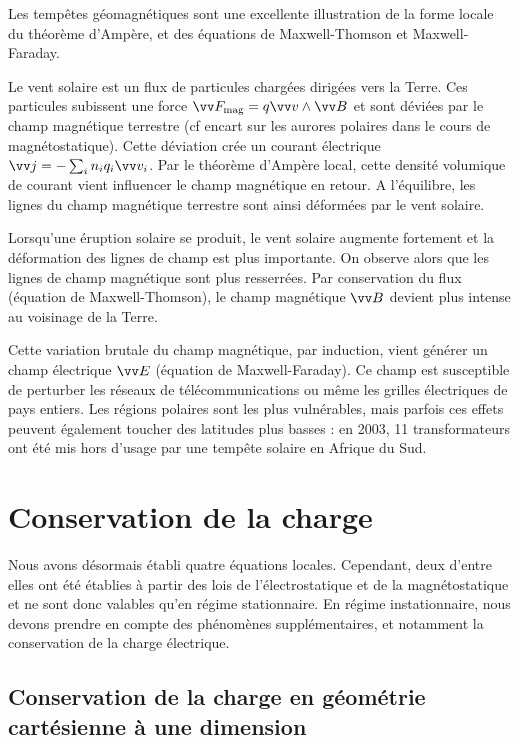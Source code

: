 \documentclass[11pt,fleqn]{book} %
\begin{document}
\begin{encart}
	Les tempêtes géomagnétiques sont une excellente illustration de la forme locale du théorème d'Ampère, et des équations de Maxwell-Thomson et Maxwell-Faraday.
	
	Le vent solaire est un flux de particules chargées dirigées vers la Terre. Ces particules subissent une force $\vv F_{\rm mag} = q \vv v \wedge \vv B$ et sont déviées par le champ magnétique terrestre (cf encart sur les aurores polaires dans le cours de magnétostatique). Cette déviation crée un courant électrique $\vv j = - \sum_i n_i q_i \vv v_i$. Par le théorème d'Ampère local, cette densité volumique de courant vient influencer le champ magnétique en retour. A l'équilibre, les lignes du champ magnétique terrestre sont ainsi déformées par le vent solaire.
	
	Lorsqu'une éruption solaire se produit, le vent solaire augmente fortement et la déformation des lignes de champ est plus importante. On observe alors que les lignes de champ magnétique sont plus resserrées. Par conservation du flux (équation de Maxwell-Thomson), le champ magnétique $\vv B$ devient plus intense au voisinage de la Terre.
	
	Cette variation brutale du champ magnétique, par induction, vient générer un champ électrique $\vv E$ (équation de Maxwell-Faraday). Ce champ est susceptible de perturber les réseaux de télécommunications ou même les grilles électriques de pays entiers. Les régions polaires sont les plus vulnérables, mais parfois ces effets peuvent également toucher des latitudes plus basses : en 2003, 11 transformateurs ont été mis hors d'usage par une tempête solaire en Afrique du Sud. 
\end{encart}

\section{Conservation de la charge}

Nous avons désormais établi quatre équations locales. Cependant, deux d'entre elles ont été établies à partir des lois de l'électrostatique et de la magnétostatique et ne sont donc valables qu'en régime stationnaire. En régime instationnaire, nous devons prendre en compte des phénomènes supplémentaires, et notamment la conservation de la charge électrique.

\subsection{Conservation de la charge en géométrie cartésienne à une dimension}
\end{document}
